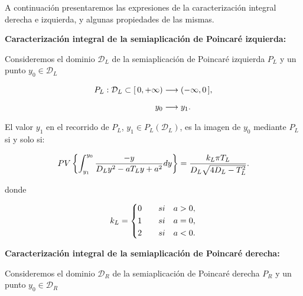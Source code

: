 \documentclass[12pt,a4paper]{report} %
\begin{document}
	\vspace{1cm} A continuación presentaremos las expresiones de la caracterización integral derecha e izquierda, y algunas propiedades de las mismas.
	
	\vspace{1cm}\noindent \textbf{Caracterización integral de la semiaplicación de Poincaré izquierda:}
	
	\vspace{0.5cm} Consideremos el dominio $\mathcal{D}_L$ de la semiaplicación de Poincaré izquierda $P_L$ y un punto $y_0 \in \mathcal{D}_L$
	
	\begin{equation}
		\label{eq:dl}
		\scalebox{1}{$\displaystyle
			\begin{aligned}
				P_L:\mathcal{D}_L\subset [\,0,+\infty) &\longrightarrow ( -\infty,0\, ],\\[2mm]
				y_0 &\longrightarrow y_1.
			\end{aligned}
			$}
	\end{equation}\smallskip
	
	\noindent El valor $y_1$ en el recorrido de $P_L$, $y_1 \in P_L(\mathcal{D}_L)$, es la imagen de $y_0$ mediante $P_L$ si y solo si:
	
	\begin{equation}
		\label{eq:caracl}
		\scalebox{1}{$\displaystyle
			PV\left\{\int_{y_1}^{y_0}\frac{-y}{D_Ly^2-aT_Ly+a^2}dy\right\}=\frac{k_L\pi T_L}{D_L\sqrt{4D_L-T_L^2}}.
			$}
	\end{equation}\smallskip
	
	\noindent donde
	
	\begin{equation*}
		k_L=
		\label{eq:kl}
		\scalebox{1}{$\displaystyle
			\left\{
			\begin{aligned}
				0 \qquad si \quad a>0, \\
				1 \qquad si \quad a=0,\\
				2 \qquad si \quad a<0. 
			\end{aligned}
			\right. 
			$}
	\end{equation*}\smallskip
	
	
		\newpage
	
	\vspace{2cm}\noindent \textbf{Caracterización integral de la semiaplicación de Poincaré derecha:}
	
	\vspace{0.5cm} Consideremos el dominio $\mathcal{D}_R$ de la semiaplicación de Poincaré derecha $P_R$ y un punto $y_0 \in \mathcal{D}_R$
	
\end{document}
